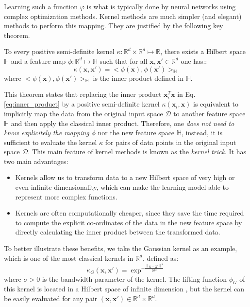 Learning such a function $\varphi$ is what is typically done by neural networks using complex optimization methods.  Kernel methods are much simpler (and elegant) methods to perform this mapping. They are justified by the following key theorem.

\begin{theorem}
	To every positive semi-definite kernel $\kappa:\mathbb{R}^d\times \mathbb{R}^d\mapsto \mathbb{R}$, there exists a Hilbert space $\mathbb{H}$ and a feature map $\phi:\mathbb{R}^d\mapsto\mathbb{H}$ such that for all $\mathbf{x},\mathbf{x}'\in\mathbb{R}^d$ one has:: 
	\begin{equation}
	\label{eq:kernel_main_equation}
	\kappa(\mathbf{x},\mathbf{x}')=<\phi(\mathbf{x}),\phi(\mathbf{x}')>_\mathbb{H}
	\end{equation}
	where $<\phi(\mathbf{x}),\phi(\mathbf{x}')>_\mathbb{H}$ is the inner product defined in $\mathbb{H}$.
\end{theorem}

This theorem states that replacing the inner product $\mathbf{x}_i^T\mathbf{x}$ in Eq. \ref{eq:inner_product} by a positive semi-definite kernel $\kappa(\mathbf{x}_i,\mathbf{x})$ is equivalent to implicitly map the data from the original input space $\mathcal{D}$ to another feature space $\mathbb{H}$ and then apply the classical inner product. Therefore, one \emph{does not need to know explicitely the mapping} $\phi$ nor the new feature space $\mathbb{H}$, instead, it is sufficient to evaluate the kernel $\kappa$ for pairs of data points in the original input space $\mathcal{D}$. This main feature of kernel methods is known as the \emph{kernel trick}. It has two main advantages:
\begin{itemize}
	\item Kernels allow us to transform data to a new Hilbert space of very high or even infinite dimensionality, which can make the learning model able to represent more complex functions.
	\item Kernels are often computationally cheaper, since they save the time required to compute the explicit co-ordinates of the data in the new feature space by directly calculating the inner product between the transformed data.
\end{itemize}
To better illustrate these benefits, we take the Gaussian kernel as an example, which is one of the most classical kernels in $\mathbb{R}^d$, defined as:
\begin{equation}
\label{eq:Guassian_kernel}
\kappa_{G}(\mathbf{x},\mathbf{x}')=\exp^{-\frac{\left \| \mathbf{x}-\mathbf{x}'\right\|^2}{2\sigma^2}}
\end{equation}
where $\sigma>0$ is the bandwidth parameter of the kernel. The lifting function $\phi_G$ of this kernel is located in a Hilbert space of infinite dimension \citep{kriege_graph_kernels}, but the kernel can be easily evaluated for any pair $(\mathbf{x},\mathbf{x}')\in\mathbb{R}^d\times \mathbb{R}^d$.

